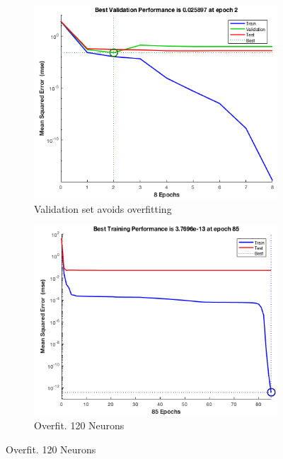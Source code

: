\documentclass[a4paper, 10pt]{article}
\begin{document}
\begin{figure}[h]
  \begin{adjustwidth}{-1.1cm}{-1.1cm}
  \centering
  \begin{subfigure}[t]{0.3\linewidth}
    \includegraphics[width=1\linewidth]{./lab1/overfit_stop.png}
    \caption{Validation set avoids overfitting}
    \label{fig:perfect_fit}
  \end{subfigure}
  \begin{subfigure}[t]{0.3\linewidth}
    \includegraphics[width=1\linewidth]{./lab1/overfit.png}
    \caption{Overfit. 120 Neurons}
    \label{fig:overfit}
  \end{subfigure}

\end{adjustwidth}
\end{figure}
\end{document}
